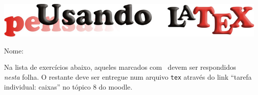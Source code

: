 \documentclass[a4paper,10pt,twocolumn,landscape]{article}
\newcommand{\mystar}{\usebox{\mystarbox}}
\begin{document}
	\begin{center}\includegraphics[width=0.8\columnwidth]{../figuras/LogotipoCursoLaTeX_v2}\end{center}

	{\noindent\Large Nome: \hrulefill}

	\bigskip

	Na lista de exercícios abaixo, aqueles marcados com \mystar\ devem ser 
	respondidos \emph{nesta} folha. O restante deve ser entregue num arquivo
	\texttt{tex} através do link ``tarefa individual: caixas'' no tópico 8 do
	moodle.

	\bigskip
\end{document}
